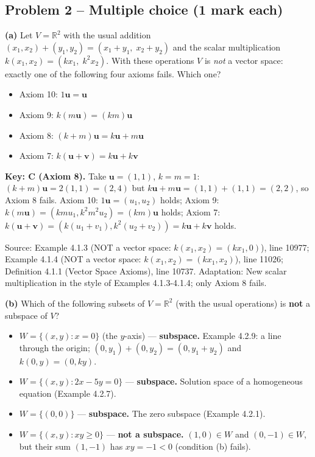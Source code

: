 \documentclass[11pt,a4paper]{article}
\newcommand{\Src}[1]{{\footnotesize\color{black!65}Source: #1}}
\begin{document}
\subsection*{Problem 2 -- Multiple choice (1 mark each)}
\textbf{(a)} Let $V=\mathbb{R}^2$ with the usual addition $(x_1,x_2)+(y_1,y_2)=(x_1+y_1,\;x_2+y_2)$ and the scalar multiplication $k(x_1,x_2)=(kx_1,\;k^2x_2)$. With these operations $V$ is \emph{not} a vector space: exactly one of the following four axioms fails. Which one?\par
\begin{itemize}[leftmargin=8mm,itemsep=0pt]\item[A] Axiom 10: $1\mathbf{u}=\mathbf{u}$\item[B] Axiom 9: $k(m\mathbf{u})=(km)\mathbf{u}$\item[C$^{\ast}$] Axiom 8: $(k+m)\mathbf{u}=k\mathbf{u}+m\mathbf{u}$\item[D] Axiom 7: $k(\mathbf{u}+\mathbf{v})=k\mathbf{u}+k\mathbf{v}$\end{itemize}
\textbf{Key: C (Axiom 8).} Take $\mathbf{u}=(1,1)$, $k=m=1$: $(k+m)\mathbf{u}=2(1,1)=(2,4)$ but $k\mathbf{u}+m\mathbf{u}=(1,1)+(1,1)=(2,2)$, so Axiom 8 fails. Axiom 10: $1\mathbf{u}=(u_1,u_2)$ holds; Axiom 9: $k(m\mathbf{u})=(kmu_1,k^2m^2u_2)=(km)\mathbf{u}$ holds; Axiom 7: $k(\mathbf{u}+\mathbf{v})=(k(u_1+v_1),k^2(u_2+v_2))=k\mathbf{u}+k\mathbf{v}$ holds.\par
\Src{Example 4.1.3 (NOT a vector space: $k(x_1,x_2)=(kx_1,0)$), line 10977; Example 4.1.4 (NOT a vector space: $k(x_1,x_2)=(kx_1,x_2)$), line 11026; Definition 4.1.1 (Vector Space Axioms), line 10737. Adaptation: New scalar multiplication in the style of Examples 4.1.3-4.1.4; only Axiom 8 fails.}\par
\textbf{(b)} Which of the following subsets of $V=\mathbb{R}^2$ (with the usual operations) is \textbf{not} a subspace of $V$?\par
\begin{itemize}[leftmargin=8mm,itemsep=0pt]\item[A] $W=\{(x,y) : x=0\}$ (the $y$-axis) --- \textbf{subspace.} Example 4.2.9: a line through the origin; $(0,y_1)+(0,y_2)=(0,y_1+y_2)$ and $k(0,y)=(0,ky)$.\item[B] $W=\{(x,y) : 2x-5y=0\}$ --- \textbf{subspace.} Solution space of a homogeneous equation (Example 4.2.7).\item[C] $W=\{(0,0)\}$ --- \textbf{subspace.} The zero subspace (Example 4.2.1).\item[D$^{\ast}$] $W=\{(x,y) : xy\ge0\}$ --- \textbf{not a subspace.} $(1,0)\in W$ and $(0,-1)\in W$, but their sum $(1,-1)$ has $xy=-1<0$ (condition (b) fails).\end{itemize}
\end{document}
